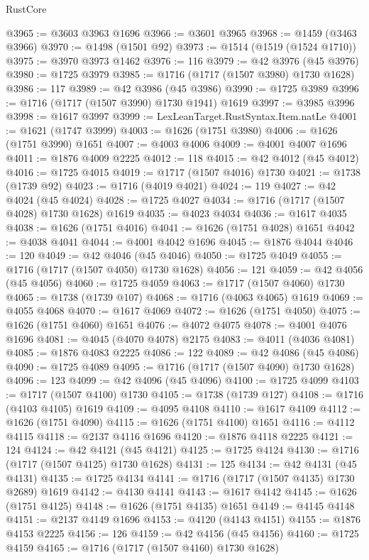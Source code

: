 \begin{lexlean}{RustCore}
\begin{coremodule}
@3965 := @3603 @3963 @1696
@3966 := @3601 @3965
@3968 := @1459 (@3463 @3966)
@3970 := @1498 (@1501 @92)
@3973 := @1514 (@1519 (@1524 @1710))
@3975 := @3970 @3973 @1462
@3976 := 116
@3979 := @42 @3976 (@45 @3976)
@3980 := @1725 @3979
@3985 := @1716 (@1717 (@1507 @3980) @1730 @1628)
@3986 := 117
@3989 := @42 @3986 (@45 @3986)
@3990 := @1725 @3989
@3996 := @1716 (@1717 (@1507 @3990) @1730 @1941) @1619
@3997 := @3985 @3996
@3998 := @1617 @3997
@3999 := LexLeanTarget.RustSyntax.Item.natLe
@4001 := @1621 (@1747 @3999)
@4003 := @1626 (@1751 @3980)
@4006 := @1626 (@1751 @3990) @1651
@4007 := @4003 @4006
@4009 := @4001 @4007 @1696
@4011 := @1876 @4009 @2225
@4012 := 118
@4015 := @42 @4012 (@45 @4012)
@4016 := @1725 @4015
@4019 := @1717 (@1507 @4016) @1730
@4021 := @1738 (@1739 @92)
@4023 := @1716 (@4019 @4021)
@4024 := 119
@4027 := @42 @4024 (@45 @4024)
@4028 := @1725 @4027
@4034 := @1716 (@1717 (@1507 @4028) @1730 @1628) @1619
@4035 := @4023 @4034
@4036 := @1617 @4035
@4038 := @1626 (@1751 @4016)
@4041 := @1626 (@1751 @4028) @1651
@4042 := @4038 @4041
@4044 := @4001 @4042 @1696
@4045 := @1876 @4044
@4046 := 120
@4049 := @42 @4046 (@45 @4046)
@4050 := @1725 @4049
@4055 := @1716 (@1717 (@1507 @4050) @1730 @1628)
@4056 := 121
@4059 := @42 @4056 (@45 @4056)
@4060 := @1725 @4059
@4063 := @1717 (@1507 @4060) @1730
@4065 := @1738 (@1739 @107)
@4068 := @1716 (@4063 @4065) @1619
@4069 := @4055 @4068
@4070 := @1617 @4069
@4072 := @1626 (@1751 @4050)
@4075 := @1626 (@1751 @4060) @1651
@4076 := @4072 @4075
@4078 := @4001 @4076 @1696
@4081 := @4045 (@4070 @4078) @2175
@4083 := @4011 (@4036 @4081)
@4085 := @1876 @4083 @2225
@4086 := 122
@4089 := @42 @4086 (@45 @4086)
@4090 := @1725 @4089
@4095 := @1716 (@1717 (@1507 @4090) @1730 @1628)
@4096 := 123
@4099 := @42 @4096 (@45 @4096)
@4100 := @1725 @4099
@4103 := @1717 (@1507 @4100) @1730
@4105 := @1738 (@1739 @127)
@4108 := @1716 (@4103 @4105) @1619
@4109 := @4095 @4108
@4110 := @1617 @4109
@4112 := @1626 (@1751 @4090)
@4115 := @1626 (@1751 @4100) @1651
@4116 := @4112 @4115
@4118 := @2137 @4116 @1696
@4120 := @1876 @4118 @2225
@4121 := 124
@4124 := @42 @4121 (@45 @4121)
@4125 := @1725 @4124
@4130 := @1716 (@1717 (@1507 @4125) @1730 @1628)
@4131 := 125
@4134 := @42 @4131 (@45 @4131)
@4135 := @1725 @4134
@4141 := @1716 (@1717 (@1507 @4135) @1730 @2689) @1619
@4142 := @4130 @4141
@4143 := @1617 @4142
@4145 := @1626 (@1751 @4125)
@4148 := @1626 (@1751 @4135) @1651
@4149 := @4145 @4148
@4151 := @2137 @4149 @1696
@4153 := @4120 (@4143 @4151)
@4155 := @1876 @4153 @2225
@4156 := 126
@4159 := @42 @4156 (@45 @4156)
@4160 := @1725 @4159
@4165 := @1716 (@1717 (@1507 @4160) @1730 @1628)

\end{coremodule}
\end{lexlean}
